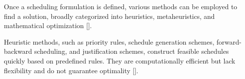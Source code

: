 \documentclass[12pt]{article}
\begin{document}



Once a scheduling formulation is defined, various methods can be employed to find a solution, broadly categorized into heuristics, metaheuristics, and mathematical optimization []. 

Heuristic methods, such as priority rules, schedule generation schemes, forward-backward scheduling, and justification schemes, construct feasible schedules quickly based on predefined rules. They are computationally efficient but lack flexibility and do not guarantee optimality []. %
\end{document}
